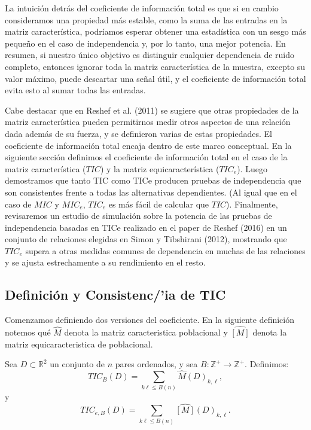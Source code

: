 	La intuici\'on detr\'as del coeficiente de informaci\'on total es que si en cambio consideramos una propiedad m\'as estable, como la suma de las entradas en la matriz caracter\'istica, podr\'iamos esperar obtener una estad\'istica con un sesgo m\'as peque\~no en el caso de independencia y, por lo tanto, una mejor potencia. En resumen, si nuestro \'unico objetivo es distinguir cualquier dependencia de ruido completo, entonces ignorar toda la matriz caracter\'istica de la muestra, excepto su valor m\'aximo, puede descartar una se\~nal \'util, y el coeficiente de informaci\'on total evita esto al sumar todas las entradas.
	
	Cabe destacar que en Reshef et al. (2011)\cite{Reshef2011} se sugiere que otras propiedades de la matriz caracter\'istica pueden permitirnos medir otros aspectos de una relaci\'on dada adem\'as de su fuerza, y se definieron varias de estas propiedades. El coeficiente de informaci\'on total encaja dentro de este marco conceptual. En la siguiente secci\'on definimos el coeficiente de informaci\'on total en el caso de la matriz caracter\'istica ($TIC$) y la matriz equicaracter\'istica ($TIC_e$). Luego demostramos que tanto TIC como TICe producen pruebas de independencia que son consistentes frente a todas las alternativas dependientes. (Al igual que en el caso de $MIC$ y $MIC_e$, $TIC_e$ es m\'as f\'acil de calcular que $TIC$). Finalmente, revisaremos un estudio de simulaci\'on sobre la potencia de las pruebas de independencia basadas en TICe realizado en el paper de Reshef (2016)\cite{Reshef2016} en un conjunto de relaciones elegidas en Simon y Tibshirani (2012)\cite[]{SimonTibshirani}, mostrando que $TIC_e$ supera a otras medidas comunes de dependencia en muchas de las relaciones y se ajusta estrechamente a su rendimiento en el resto.


	\subsection[definicionyconcitenciatic]{Definici\'on y Consistenc/'ia de TIC}

	Comenzamos definiendo dos versiones del coeficiente. En la siguiente definici\'on notemos qu\'e $\widehat{M}$ denota la matriz caracteristica poblacional y $\widehat{[M]}$ denota la matriz equicaracteristica de poblacional.

	\begin{defn}
		Sea $D \subset \mathbb{R}^2$ un conjunto de $n$ pares ordenados, y sea $B: \mathbb{Z}^{+} \rightarrow \mathbb{Z}^{+}$. Definimos:
		$$
		T I C_B(D)=\sum_{k \ell \leq B(n)} \widehat{M}(D)_{k, \ell},
		$$
		y
		$$
		T I C_{e, B}(D)=\sum_{k \ell \leq B(n)} \widehat{[M]}(D)_{k, \ell}.
		$$
	\end{defn}

